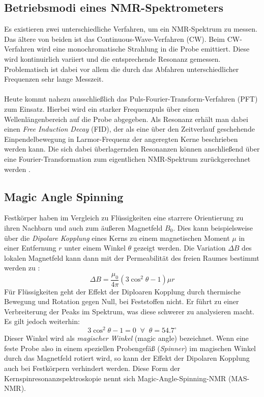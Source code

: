 \documentclass[a4paper, 11pt, headsepline,footsepline,twoside,abstract]{scrbook}
\begin{document}
\subsection{Betriebsmodi eines NMR-Spektrometers}
Es existieren zwei unterschiedliche Verfahren, um ein NMR-Spektrum zu messen. Das ältere von beiden ist das Continuous-Wave-Verfahren (CW). Beim CW-Verfahren wird eine monochromatische Strahlung in die Probe emittiert. Diese wird kontinuirlich variiert und die entsprechende Resonanz gemessen. Problematisch ist dabei vor allem die durch das Abfahren unterschiedlicher Frequenzen sehr lange Messzeit.
\\\\
Heute kommt nahezu ausschließlich das Puls-Fourier-Transform-Verfahren (PFT) zum Einsatz. Hierbei wird ein starker Frequenzpuls über einen Wellenlängenbereich auf die Probe abgegeben. Als Resonanz erhält man dabei einen \textit{Free Induction Decay} (FID), der als eine über den Zeitverlauf geschehende Einpendelbewegung in Larmor-Frequenz der angeregten Kerne beschrieben werden kann. Die sich dabei überlagernden Resonanzen können anschließend über eine Fourier-Transformation zum eigentlichen NMR-Spektrum zurückgerechnet werden \cite{Guenther2013}.
\subsection{Magic Angle Spinning}
Festkörper haben im Vergleich zu Flüssigkeiten eine starrere Orientierung zu ihren Nachbarn und auch zum äußeren Magnetfeld $B_0$. Dies kann beispielsweise über die \textit{Dipolare Kopplung} eines Kerns zu einem magnetischen Moment $\mu$ in einer Entfernung $r$ unter einem Winkel $\theta$ gezeigt werden. Die Variation $\Delta B$ des lokalen Magnetfeld kann dann mit der Permeabilität des freien Raumes bestimmt werden zu \cite{Guenther2013}:
\begin{equation}
\Delta B = \frac{\mu_0}{4\pi}(3\cos^2\theta - 1)\mu r
\end{equation}
Für Flüssigkeiten geht der Effekt der Diploaren Kopplung  durch thermische Bewegung und Rotation gegen Null, bei Feststoffen nicht. Er führt zu einer Verbreiterung der Peaks im Spektrum, was diese schwerer zu analysieren macht. Es gilt jedoch weiterhin:
\begin{equation}
3\cos^2\theta-1 = 0 \;\; \forall \;\; \theta = 54.7^\circ
\end{equation}
Dieser Winkel wird als \textit{magischer Winkel} (magic angle) bezeichnet. Wenn eine feste Probe also in einem speziellen Probengefäß (\textit{Spinner}) im magischen Winkel durch das Magnetfeld rotiert wird, so kann der Effekt der Dipolaren Kopplung auch bei Festkörpern verhindert werden. Diese Form der Kernspinresonanzspektroskopie nennt sich Magic-Angle-Spinning-NMR (MAS-NMR).
\end{document}
